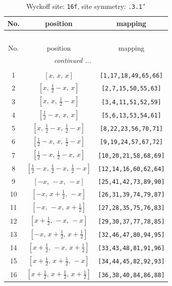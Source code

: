 \documentclass[fleqn,8pt]{jsarticle}
\begin{document}
\renewcommand{\arraystretch}{1.2}
\begin{longtable}{ccc}
\caption{Wyckoff site: {\tt 16f}, site symmetry: {\tt .3.1'}}
 \\
 \hline \hline
No. & position & mapping \\ \hline \endfirsthead

\multicolumn{2}{l}{\tablename\ \thetable{}} \\
 \hline \hline
No. & position & mapping \\ \hline \endhead

 \hline \hline
\multicolumn{2}{r}{\footnotesize\it continued ...} \\ \endfoot

 \hline \hline
\multicolumn{2}{r}{} \\ \endlastfoot

1 & $\left[ x,\, x,\, x \right]$ & {\tt [1,17,18,49,65,66]} \\ \hline
2 & $\left[ x,\, \frac{1}{2} - x,\, x \right]$ & {\tt [2,7,15,50,55,63]} \\ \hline
3 & $\left[ x,\, x,\, \frac{1}{2} - x \right]$ & {\tt [3,4,11,51,52,59]} \\ \hline
4 & $\left[ \frac{1}{2} - x,\, x,\, x \right]$ & {\tt [5,6,13,53,54,61]} \\ \hline
5 & $\left[ x,\, \frac{1}{2} - x,\, \frac{1}{2} - x \right]$ & {\tt [8,22,23,56,70,71]} \\ \hline
6 & $\left[ \frac{1}{2} - x,\, x,\, \frac{1}{2} - x \right]$ & {\tt [9,19,24,57,67,72]} \\ \hline
7 & $\left[ \frac{1}{2} - x,\, \frac{1}{2} - x,\, x \right]$ & {\tt [10,20,21,58,68,69]} \\ \hline
8 & $\left[ \frac{1}{2} - x,\, \frac{1}{2} - x,\, \frac{1}{2} - x \right]$ & {\tt [12,14,16,60,62,64]} \\ \hline
9 & $\left[ - x,\, - x,\, - x \right]$ & {\tt [25,41,42,73,89,90]} \\ \hline
10 & $\left[ - x,\, x + \frac{1}{2},\, - x \right]$ & {\tt [26,31,39,74,79,87]} \\ \hline
11 & $\left[ - x,\, - x,\, x + \frac{1}{2} \right]$ & {\tt [27,28,35,75,76,83]} \\ \hline
12 & $\left[ x + \frac{1}{2},\, - x,\, - x \right]$ & {\tt [29,30,37,77,78,85]} \\ \hline
13 & $\left[ - x,\, x + \frac{1}{2},\, x + \frac{1}{2} \right]$ & {\tt [32,46,47,80,94,95]} \\ \hline
14 & $\left[ x + \frac{1}{2},\, - x,\, x + \frac{1}{2} \right]$ & {\tt [33,43,48,81,91,96]} \\ \hline
15 & $\left[ x + \frac{1}{2},\, x + \frac{1}{2},\, - x \right]$ & {\tt [34,44,45,82,92,93]} \\ \hline
16 & $\left[ x + \frac{1}{2},\, x + \frac{1}{2},\, x + \frac{1}{2} \right]$ & {\tt [36,38,40,84,86,88]} \\
\end{longtable}
\end{document}
